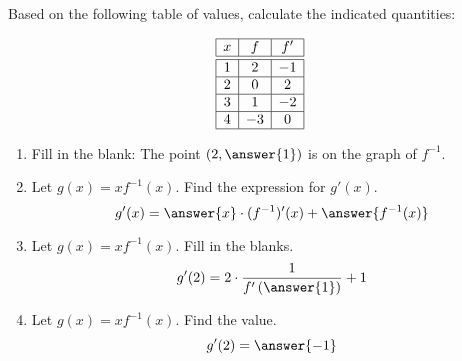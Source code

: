 \documentclass{ximera}
\author{Steven Gubkin\and Nela Lakos}
\begin{document}
\begin{exercise}

Based on the following table of values, calculate the indicated quantities:

 \[
  \begin{array}{|c|c|c|}\hline
    x & f  & f' \\ \hline \hline
    1 & 2 & -1 \\ \hline
    2 & 0  & 2  \\ \hline
    3 & 1  & -2 \\ \hline
    4 & -3 & 0  \\ \hline
  \end{array}
  \]
\begin{enumerate}
\item Fill in the blank: The point $(2, \answer{1})$ is on the graph of $f^{-1}$.

\item Let $g(x) =  xf^{-1}(x)$.  
Find the expression for $g'(x)$.
\[
g'(x) = \answer{x}\cdot (f^{-1})'(x)+\answer{f^{-1}(x)}
\]
\item Let $g(x) =  xf^{-1}(x)$. Fill in the blanks.
\[
g'(2) =2\cdot \frac{1}{f'\left(\answer{1}\right)}+1
\]
\item  Let $g(x) =  xf^{-1}(x)$. Find the value.
\[
g'(2) =\answer{-1}
\]
\end{enumerate}
\end{exercise}
\end{document}
